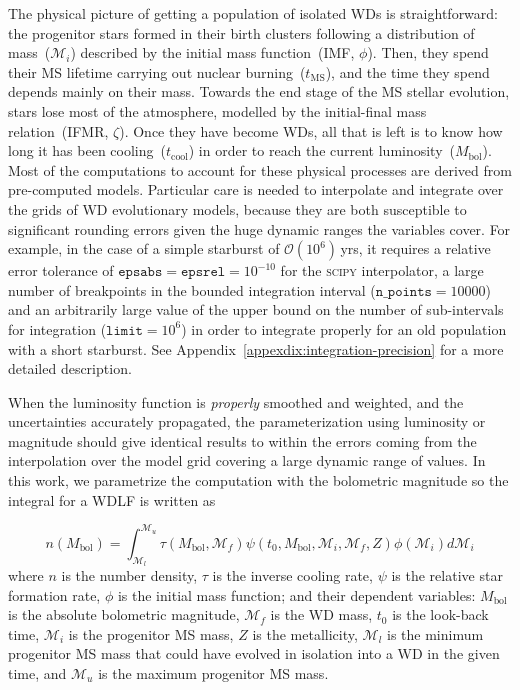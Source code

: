 \documentclass[fleqn,usenatbib]{mnras}
\begin{document}
The physical picture of getting a population of isolated WDs is
straightforward: the progenitor stars formed in their birth clusters
following a distribution of mass~($\mathcal{M}_i$) described by the initial
mass function~(IMF, $\phi$). Then, they spend their MS lifetime carrying out
nuclear burning~($t_{\mathrm{MS}}$), and the time they spend depends mainly
on their mass. Towards the end stage of the MS stellar evolution, stars lose
most of the atmosphere, modelled by the initial-final mass relation~(IFMR,
$\zeta$). Once they have become WDs, all that is left is to know how long it
has been cooling~($t_{\mathrm{cool}}$) in order to reach the current
luminosity~($M_\mathrm{bol}$). Most of the computations to account for these
physical processes are derived from pre-computed models. Particular care is
needed to interpolate and integrate over the grids of WD evolutionary models,
because they are both susceptible to significant rounding errors given the huge
dynamic ranges the variables cover. For example, in the case of a simple
starburst of $\mathcal{O}(10^6)$\,yrs, it requires a relative error tolerance
of $\texttt{epsabs} = \texttt{epsrel} = 10^{-10}$ for the \textsc{scipy} 
interpolator, a large number of breakpoints in the bounded integration interval
($\texttt{n\_points} = 10000$) and an arbitrarily large value of the upper bound
on the number of sub-intervals for integration ($\texttt{limit} = 10^{6}$) in
order to integrate properly for an old population with a short 
starburst. See Appendix~\ref{appexdix:integration-precision} for a more 
detailed description.

When the luminosity function is \textit{properly} smoothed and weighted, and the
uncertainties accurately propagated, the parameterization using luminosity or
magnitude should give identical results to within the errors coming from
the interpolation over the model grid covering a large dynamic range of values.
In this work, we parametrize the computation with the bolometric magnitude so
the integral for a WDLF is written as

\begin{equation} \label{eqn:wdlf}
    n(M_{\mathrm{bol}}) = \int_{\mathcal{M}_l}^{\mathcal{M}_u}
        \tau(M_\mathrm{bol}, \mathcal{M}_f)
        \psi(t_0, M_\mathrm{bol}, \mathcal{M}_i, \mathcal{M}_f, Z)
        \phi(\mathcal{M}_i) d\mathcal{M}_i
\end{equation}
where $n$ is the number density, $\tau$ is the inverse cooling rate, $\psi$ is
the relative star formation rate, $\phi$ is the initial mass function; and their
dependent variables: $M_\mathrm{bol}$ is the absolute bolometric
magnitude, $\mathcal{M}_f$ is the WD mass, $t_0$ is the look-back time, $\mathcal{M}_i$ is
the progenitor MS mass, $Z$ is the metallicity, $\mathcal{M}_l$ is the minimum
progenitor MS mass that could have evolved in isolation into a WD in the given time,
and $\mathcal{M}_u$ is the maximum progenitor MS mass.
\end{document}
